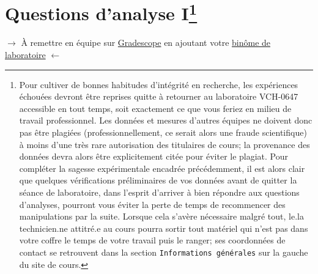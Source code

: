 \documentclass[canadien,12pt,oneside,letterpaper]{article}
\begin{document}



\vspace{-0.5cm}
\section[Questions d'analyse I]{Questions d'analyse I\footnote{Pour cultiver de bonnes habitudes d'intégrité en recherche, les expériences échouées devront être reprises quitte à retourner au laboratoire VCH-0647 accessible en tout temps, soit exactement ce que vous feriez en milieu de travail professionnel. Les données et mesures d'autres équipes ne doivent donc pas être plagiées (professionnellement, ce serait alors une fraude scientifique) à moins d'une très rare autorisation des titulaires de cours; la provenance des données devra alors être explicitement citée pour éviter le plagiat. Pour compléter la sagesse expérimentale encadrée précédemment, il est alors clair que quelques vérifications préliminaires de vos données avant de quitter la séance de laboratoire, dans l'esprit d'arriver à bien répondre aux questions d'analyses, pourront vous éviter la perte de temps de recommencer des manipulations par la suite. Lorsque cela s'avère nécessaire malgré tout, le.la technicien.ne attitré.e au cours pourra sortir tout matériel qui n'est pas dans votre coffre le temps de votre travail puis le ranger; ses coordonnées de contact se retrouvent dans la section \texttt{Informations générales} sur la gauche du site de cours.}} \label{sec:grade} 

\vspace{-0.5cm}
\noindent$\rightarrow$ À remettre en équipe sur \href{https://www.gradescope.com/}{Gradescope} en ajoutant votre \href{https://help.gradescope.com/article/m5qz2xsnjy-student-add-group-members}{binôme de laboratoire} $\leftarrow$

\end{document}
